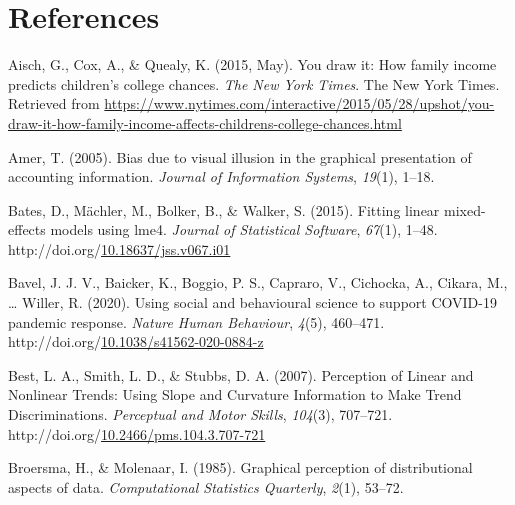 \documentclass[print]{nuthesis}
\newlength{\cslhangindent}
\newenvironment{CSLReferences}%
{\setlength{\parindent}{0pt}%
\everypar{\setlength{\hangindent}{\cslhangindent}}\ignorespaces}%
{\par}
\begin{document}
\backmatter

\hypertarget{references}{%
\chapter*{References}\label{references}}

\noindent

\setlength{\parindent}{-0.20in}
\setlength{\leftskip}{0.20in}
\setlength{\parskip}{8pt}

\hypertarget{refs}{}
\begin{CSLReferences}{1}{0}
\leavevmode\hypertarget{ref-aisch_cox_quealy_2015}{}%
Aisch, G., Cox, A., \& Quealy, K. (2015, May). You draw it: How family income predicts children's college chances. \emph{The New York Times}. The New York Times. Retrieved from \url{https://www.nytimes.com/interactive/2015/05/28/upshot/you-draw-it-how-family-income-affects-childrens-college-chances.html}

\leavevmode\hypertarget{ref-amer2005bias}{}%
Amer, T. (2005). Bias due to visual illusion in the graphical presentation of accounting information. \emph{Journal of Information Systems}, \emph{19}(1), 1--18.

\leavevmode\hypertarget{ref-lme4}{}%
Bates, D., Mächler, M., Bolker, B., \& Walker, S. (2015). Fitting linear mixed-effects models using {lme4}. \emph{Journal of Statistical Software}, \emph{67}(1), 1--48. http://doi.org/\href{https://doi.org/10.18637/jss.v067.i01}{10.18637/jss.v067.i01}

\leavevmode\hypertarget{ref-bavel_using_2020}{}%
Bavel, J. J. V., Baicker, K., Boggio, P. S., Capraro, V., Cichocka, A., Cikara, M., \ldots{} Willer, R. (2020). Using social and behavioural science to support {COVID}-19 pandemic response. \emph{Nature Human Behaviour}, \emph{4}(5), 460--471. http://doi.org/\href{https://doi.org/10.1038/s41562-020-0884-z}{10.1038/s41562-020-0884-z}

\leavevmode\hypertarget{ref-best_perception_2007}{}%
Best, L. A., Smith, L. D., \& Stubbs, D. A. (2007). Perception of {Linear} and {Nonlinear} {Trends}: {Using} {Slope} and {Curvature} {Information} to {Make} {Trend} {Discriminations}. \emph{Perceptual and Motor Skills}, \emph{104}(3), 707--721. http://doi.org/\href{https://doi.org/10.2466/pms.104.3.707-721}{10.2466/pms.104.3.707-721}

\leavevmode\hypertarget{ref-broersma1985graphical}{}%
Broersma, H., \& Molenaar, I. (1985). Graphical perception of distributional aspects of data. \emph{Computational Statistics Quarterly}, \emph{2}(1), 53--72.


\end{CSLReferences}
\end{document}
